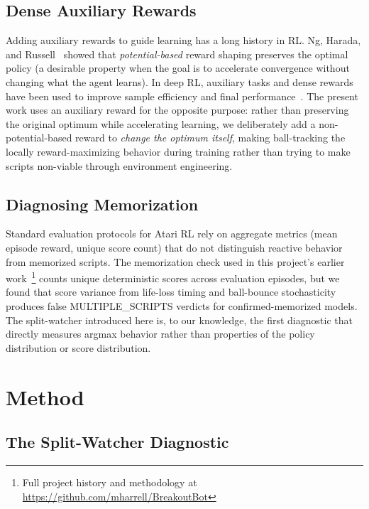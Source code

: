 \documentclass[11pt]{article}
\begin{document}
\subsection{Dense Auxiliary Rewards}

Adding auxiliary rewards to guide learning has a long history
in RL. Ng, Harada, and Russell~\cite{ng1999shaping} showed that
\emph{potential-based} reward shaping preserves the optimal policy (a
desirable property when the goal is to accelerate convergence without changing
what the agent learns). In deep RL, auxiliary tasks and dense rewards have
been used to improve sample efficiency and final performance~\cite{jaderberg2017auxiliary}.
The present work uses an auxiliary reward for the opposite purpose: rather than
preserving the original optimum while accelerating learning, we deliberately add
a non-potential-based reward to \emph{change the optimum itself}, making
ball-tracking the locally reward-maximizing behavior during training rather
than trying to make scripts non-viable through environment engineering.

\subsection{Diagnosing Memorization}

Standard evaluation protocols for Atari RL rely on aggregate metrics (mean
episode reward, unique score count) that do not distinguish reactive behavior
from memorized scripts. The memorization check used in this project's earlier
work~\footnote{Full project history and methodology at
\url{https://github.com/mharrell/BreakoutBot}} counts unique deterministic
scores across evaluation episodes, but we found that score variance from
life-loss timing and ball-bounce stochasticity produces false MULTIPLE\_SCRIPTS
verdicts for confirmed-memorized models. The split-watcher introduced here is,
to our knowledge, the first diagnostic that directly measures argmax behavior
rather than properties of the policy distribution or score distribution.

\section{Method}

\subsection{The Split-Watcher Diagnostic}
\end{document}
